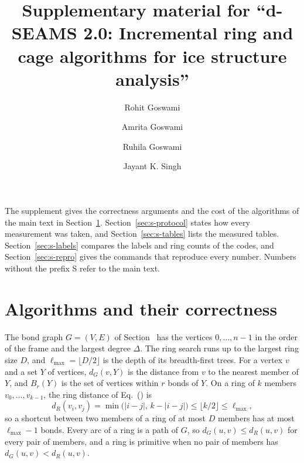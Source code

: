 \documentclass[preprint,12pt]{elsarticle}
\begin{document}
\begin{frontmatter}
\title{Supplementary material for ``d-SEAMS 2.0: Incremental ring and cage algorithms for ice structure analysis''}

\author[iitk]{Rohit
Goswami}
 \author[iitk]{Amrita
Goswami}
 \author[hi-life]{Ruhila
Goswami} 
\author[iitk]{Jayant K.
Singh}
 
\address[iitk]{Department of Chemical Engineering, Indian Institute of Technology Kanpur, Kanpur 208016, Uttar Pradesh, India}
\address[hi-life]{Faculty of Life and Environmental Sciences, University of Iceland, Reykjavik, Iceland}
\end{frontmatter}

The supplement gives the correctness arguments and the cost of the
algorithms of the main text in Section~\ref{sec:s-algorithms}.
Section~\ref{sec:s-protocol} states how every measurement was taken, and
Section~\ref{sec:s-tables} lists the measured tables.
Section~\ref{sec:s-labels} compares the labels and ring counts of the
codes, and Section~\ref{sec:s-repro} gives the commands that reproduce
every number.
Numbers without the prefix S refer to the main text.

\section{Algorithms and their correctness}
\label{sec:s-algorithms}

The bond graph $G=(V,E)$ of Section~ has the vertices
$0,\dots,n-1$ in the order of the frame and the largest degree $\Delta$.
The ring search runs up to the largest ring size $D$, and
$\ell_{\max}=\lfloor D/2\rfloor$ is the depth of its breadth-first
trees.
For a vertex $v$ and a set $Y$ of vertices, $d_G(v,Y)$ is the distance
from $v$ to the nearest member of $Y$, and $B_r(Y)$ is the set of
vertices within $r$ bonds of $Y$.
On a ring of $k$ members $v_0,\dots,v_{k-1}$, the ring distance of
Eq.~() is
\begin{equation}
  d_R(v_i,v_j)=\min\bigl(|i-j|,\,k-|i-j|\bigr)\le\lfloor k/2\rfloor\le\ell_{\max},
  \label{eq:s-arc}
\end{equation}
so a shortcut between two members of a ring of at most $D$ members has
at most $\ell_{\max}-1$ bonds.
Every arc of a ring is a path of $G$, so $d_G(u,v)\le d_R(u,v)$ for
every pair of members, and a ring is primitive when no pair of members
has $d_G(u,v)<d_R(u,v)$.
\end{document}
